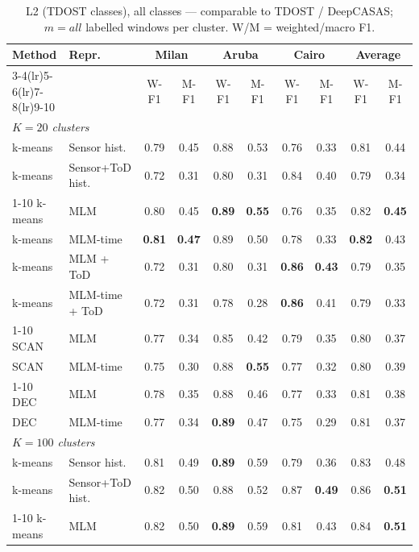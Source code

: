 \begin{table}[t]
\centering\small
\caption{L2 (TDOST classes), all classes --- comparable to TDOST / DeepCASAS; $m=all$ labelled windows per cluster. W/M = weighted/macro F1.}
\label{tab:l2_all_mall}
\setlength{\tabcolsep}{4pt}
\begin{tabular}{llcccccc|cc}
\toprule
Method & Repr. & \multicolumn{2}{c}{Milan} & \multicolumn{2}{c}{Aruba} & \multicolumn{2}{c}{Cairo} & \multicolumn{2}{c}{Average} \\
\cmidrule(lr){3-4}\cmidrule(lr){5-6}\cmidrule(lr){7-8}\cmidrule(lr){9-10}
 & & W-F1 & M-F1 & W-F1 & M-F1 & W-F1 & M-F1 & W-F1 & M-F1 \\
\midrule
\multicolumn{10}{l}{\textit{$K = 20$ clusters}} \\
\midrule
k-means & Sensor hist. & 0.79 & 0.45 & 0.88 & 0.53 & 0.76 & 0.33 & 0.81 & 0.44 \\
k-means & Sensor+ToD hist. & 0.72 & 0.31 & 0.80 & 0.31 & 0.84 & 0.40 & 0.79 & 0.34 \\
\cmidrule{1-10}
k-means & MLM & 0.80 & 0.45 & \textbf{0.89} & \textbf{0.55} & 0.76 & 0.35 & 0.82 & \textbf{0.45} \\
k-means & MLM-time & \textbf{0.81} & \textbf{0.47} & 0.89 & 0.50 & 0.78 & 0.33 & \textbf{0.82} & 0.43 \\
k-means & MLM + ToD & 0.72 & 0.31 & 0.80 & 0.31 & \textbf{0.86} & \textbf{0.43} & 0.79 & 0.35 \\
k-means & MLM-time + ToD & 0.72 & 0.31 & 0.78 & 0.28 & \textbf{0.86} & 0.41 & 0.79 & 0.33 \\
\cmidrule{1-10}
SCAN & MLM & 0.77 & 0.34 & 0.85 & 0.42 & 0.79 & 0.35 & 0.80 & 0.37 \\
SCAN & MLM-time & 0.75 & 0.30 & 0.88 & \textbf{0.55} & 0.77 & 0.32 & 0.80 & 0.39 \\
\cmidrule{1-10}
DEC & MLM & 0.78 & 0.35 & 0.88 & 0.46 & 0.77 & 0.33 & 0.81 & 0.38 \\
DEC & MLM-time & 0.77 & 0.34 & \textbf{0.89} & 0.47 & 0.75 & 0.29 & 0.81 & 0.37 \\
\midrule
\multicolumn{10}{l}{\textit{$K = 100$ clusters}} \\
\midrule
k-means & Sensor hist. & 0.81 & 0.49 & \textbf{0.89} & 0.59 & 0.79 & 0.36 & 0.83 & 0.48 \\
k-means & Sensor+ToD hist. & 0.82 & 0.50 & 0.88 & 0.52 & 0.87 & \textbf{0.49} & 0.86 & \textbf{0.51} \\
\cmidrule{1-10}
k-means & MLM & 0.82 & 0.50 & \textbf{0.89} & 0.59 & 0.81 & 0.43 & 0.84 & \textbf{0.51} \\

\end{tabular}
\end{table}
